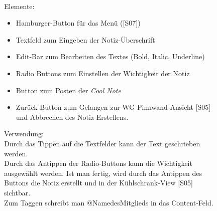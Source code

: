 \documentclass[a4paper]{scrreprt}
\begin{document}
\begin{figure}[h!]
\begin{minipage}[t]{0.55\linewidth}
    			\hfill 
    			\\Elemente:\\
    			\begin{itemize}
    				\renewcommand\labelitemi{--}
    				\item  Hamburger-Button für das Menü ({[}S07{]})
    				\item Textfeld zum Eingeben der Notiz-Überschrift
    				\item Edit-Bar zum Bearbeiten des Textes (Bold,
    				Italic, Underline)
    				\item Radio Buttons zum Einstellen der Wichtigkeit 
    				der Notiz
    				\item Button zum Posten der \textit{Cool Note}
    				\item Zurück-Button zum Gelangen zur
    				WG-Pinnwand-Ansicht {[}S05{]} und Abbrechen des Notiz-Erstellens.
    				
    			\end{itemize}
    			
    			
    			\hfill 
    			
    			Verwendung:\\
    			Durch das Tippen auf die Textfelder kann 
    			der Text geschrieben werden.\\
    			Durch das
    			Antippen der Radio-Buttons kann die 
    			Wichtigkeit ausgewählt werden. Ist man 
    			fertig, wird durch das Antippen des Buttons
    			die Notiz erstellt und  in der
    			Kühlschrank-View {[}S05{]} sichtbar.\\ 
    			Zum
    			Taggen schreibt man @NamedesMitglieds  
    			in das Content-Feld.
    			
    			
    			
    		\end{minipage}
    	\end{figure}
    	
    	\clearpage
    	
\end{document}
